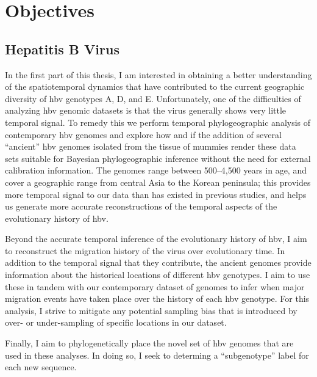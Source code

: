 \chapter{Objectives}
\label{ch:objectives}

\section{Hepatitis B Virus}

In the first part of this thesis, I am interested in obtaining a better understanding of the spatiotemporal dynamics that have contributed to the current geographic diversity of \gls{hbv} genotypes A, D, and E.
Unfortunately, one of the difficulties of analyzing \gls{hbv} genomic datasets is that the virus generally shows very little temporal signal.
To remedy this we perform temporal phylogeographic analysis of contemporary \gls{hbv} genomes and explore how and if the addition of several ``ancient'' \gls{hbv} genomes isolated from the tissue of mummies \cite{muhlemann2018ancient, ross2018paradox} render these data sets suitable for Bayesian phylogeographic inference without the need for external calibration information.
The genomes range between 500--4,500 years in age, and cover a geographic range from central Asia to the Korean peninsula; this provides more temporal signal to our data than has existed in previous studies, and helps us generate more accurate reconstructions of the temporal aspects of the evolutionary history of \gls{hbv}.

Beyond the accurate temporal inference of the evolutionary history of \gls{hbv}, I aim to reconstruct the migration history of the virus over evolutionary time.
In addition to the temporal signal that they contribute, the ancient genomes provide information about the historical locations of different \gls{hbv} genotypes.
I aim to use these in tandem with our contemporary dataset of genomes to infer when major migration events have taken place over the history of each \gls{hbv} genotype.
For this analysis, I strive to mitigate any potential sampling bias that is introduced by over- or under-sampling of specific locations in our dataset.

Finally, I aim to phylogenetically place the novel set of \gls{hbv} genomes that are used in these analyses.
In doing so, I seek to determing a ``subgenotype'' label for each new sequence. %

